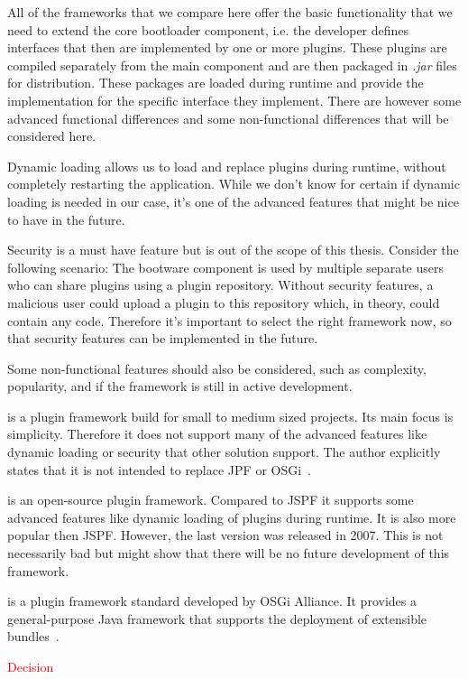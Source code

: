 All of the frameworks that we compare here offer the basic functionality that we need to extend the core bootloader component, i.e. the developer defines interfaces that then are implemented by one or more plugins.
These plugins are compiled separately from the main component and are then packaged in \textit{.jar} files for distribution.
These packages are loaded during runtime and provide the implementation for the specific interface they implement.
There are however some advanced functional differences and some non-functional differences that will be considered here.

Dynamic loading allows us to load and replace plugins during runtime, without completely restarting the application.
While we don't know for certain if dynamic loading is needed in our case, it's one of the advanced features that might be nice to have in the future.

Security is a must have feature but is out of the scope of this thesis.
Consider the following scenario: The bootware component is used by multiple separate users who can share plugins using a plugin repository.
Without security features, a malicious user could upload a plugin to this repository which, in theory, could contain any code.
Therefore it's important to select the right framework now, so that security features can be implemented in the future.

Some non-functional features should also be considered, such as complexity, popularity, and if the framework is still in active development.

 is a plugin framework build for small to medium sized projects.
Its main focus is simplicity.
Therefore it does not support many of the advanced features like dynamic loading or security that other solution support.
The author explicitly states that it is not intended to replace JPF or OSGi~\autocite{jspf:faq}.

 is an open-source plugin framework.
Compared to JSPF it supports some advanced features like dynamic loading of plugins during runtime.
It is also more popular then JSPF.
However, the last version was released in 2007.
This is not necessarily bad but might show that there will be no future development of this framework.

 is a plugin framework standard developed by OSGi Alliance.
It provides a general-purpose Java framework that supports the deployment of extensible bundles~\autocite{osgi:spec}.

\textcolor{red}{Decision}
